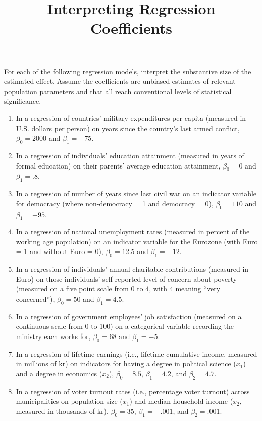 \documentclass[a4paper,12pt]{article}
\title{Interpreting Regression Coefficients}
\author{}
\date{}
\begin{document}
\maketitle

For each of the following regression models, interpret the substantive size of the estimated effect. Assume the coefficients are unbiased estimates of relevant population parameters and that all reach conventional levels of statistical significance.

\begin{enumerate}\itemsep0.5em
\item In a regression of countries' military expenditures per capita (measured in U.S. dollars per person) on years since the country's last armed conflict, $\beta_0 = 2000$ and $\beta_1 = -75$.
\item In a regression of individuals' education attainment (measured in years of formal education) on their parents' average education attainment, $\beta_0 = 0$ and $\beta_1 = .8$.

\vspace{1.5em}

\item In a regression of number of years since last civil war on an indicator variable for democracy (where non-democracy = 1 and democracy = 0), $\beta_0 = 110$ and $\beta_1 = -95$.
\item In a regression of national unemployment rates (measured in percent of the working age population) on an indicator variable for the Eurozone (with Euro = 1 and without Euro = 0), $\beta_0 = 12.5$ and $\beta_1 = -12$.

\vspace{1.5em}

\item In a regression of individuals' annual charitable contributions (measured in Euro) on those individuals' self-reported level of concern about poverty (measured on a five point scale from 0 to 4, with 4 meaning ``very concerned''), $\beta_0 = 50$ and $\beta_1 = 4.5$.
\item In a regression of government employees' job satisfaction (measured on a continuous scale from 0 to 100) on a categorical variable recording the ministry each works for, $\beta_0 = 68$ and $\beta_1 = -5$.

\vspace{1.5em}

\item In a regression of lifetime earnings (i.e., lifetime cumulative income, measured in millions of kr) on indicators for having a degree in political science ($x_1$) and a degree in economics ($x_2$), $\beta_0 = 8.5$, $\beta_1 = 4.2$, and $\beta_2 = 4.7$.
\item In a regression of voter turnout rates (i.e., percentage voter turnout) across municipalities on population size ($x_1$) and median household income ($x_2$, measured in thousands of kr), $\beta_0 = 35$, $\beta_1 = -.001$, and $\beta_2 = .001$.

\end{enumerate}
\end{document}
